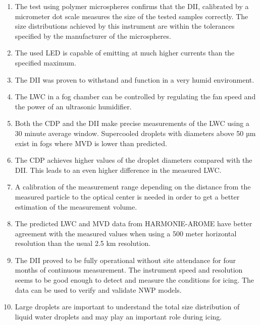 \begin{enumerate}
\item
The test using polymer microspheres confirms that the DII, calibrated by a micrometer dot scale measures the size of the tested samples correctly. The size distributions achieved by this instrument are within the tolerances specified by the manufacturer of the microspheres.

\item
The used LED is capable of emitting at much higher currents than the specified maximum.

\item
The DII was proven to withstand and function in a very humid environment. 

\item
The LWC in a fog chamber can be controlled by regulating the fan speed and the power of an ultrasonic humidifier. 

\item
Both the CDP and the DII make precise measurements of the LWC using a 30 minute average window. Supercooled droplets with diameters above 50 µm  exist in fogs where MVD is lower than predicted.

\item
The CDP achieves higher values of the droplet diameters compared with the DII. This leads to an even higher difference in the measured LWC.

\item
A calibration of the measurement range depending on the distance from the measured particle to the optical center is needed in order to get a better estimation of the measurement volume.

\item
The predicted LWC and MVD data from HARMONIE-AROME have better agreement with the measured values when using a 500 meter horizontal resolution than the usual 2.5 km resolution.

\item
The DII proved to be fully operational without site attendance for four months of continuous measurement. The instrument speed and resolution seems to be good enough to detect and measure the conditions for icing. The data can be used to verify and validate NWP models.

\item
Large droplets are important to understand the total size distribution of liquid water droplets and may play an important role during icing. 

\end{enumerate}

